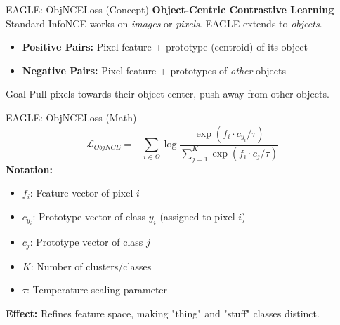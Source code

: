 \documentclass[aspectratio=169]{beamer}
\begin{document}
\begin{frame}{EAGLE: ObjNCELoss (Concept)}
\textbf{Object-Centric Contrastive Learning}
Standard InfoNCE works on \textit{images} or \textit{pixels}. EAGLE extends to \textit{objects}.
\vspace{0.5cm}
\begin{itemize}
    \item \textbf{Positive Pairs:} Pixel feature + prototype (centroid) of its object
    \item \textbf{Negative Pairs:} Pixel feature + prototypes of \textit{other} objects
\end{itemize}
\vspace{0.3cm}
\begin{block}{Goal}
Pull pixels towards their object center, push away from other objects.
\end{block}
\end{frame}
\begin{frame}{EAGLE: ObjNCELoss (Math)}
\begin{equation}
\mathcal{L}_{ObjNCE} = - \sum_{i \in \Omega} \log \frac{\exp(f_i \cdot c_{y_i} / \tau)}{\sum_{j=1}^{K} \exp(f_i \cdot c_j / \tau)}
\end{equation}
\textbf{Notation:}
\begin{itemize}
    \item $f_i$: Feature vector of pixel $i$
    \item $c_{y_i}$: Prototype vector of class $y_i$ (assigned to pixel $i$)
    \item $c_j$: Prototype vector of class $j$
    \item $K$: Number of clusters/classes
    \item $\tau$: Temperature scaling parameter
\end{itemize}
\vspace{0.3cm}
\textbf{Effect:} Refines feature space, making "thing" and "stuff" classes distinct.
\end{frame}
\end{document}
